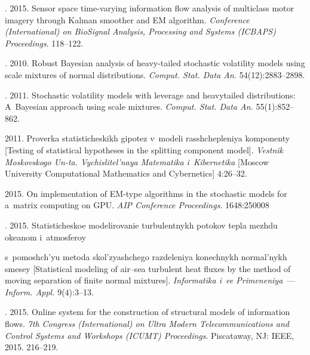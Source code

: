\begin{multicols}{2}
{{\begin{thebibliography}{99}
. 
2015. Sensor space time-varying information flow analysis of multiclass motor 
imagery through Kalman smoother and EM algorithm. \textit{Conference (International) on 
BioSignal Analysis, Processing and Systems (ICBAPS) Proceedings}. 118--122.

. 
2010. Robust Bayesian analysis of heavy-tailed stochastic volatility models using 
scale mixtures of normal distributions. 
\textit{Comput. Stat. Data An.} 54(12):2883--2898.

. 2011. 
Stochastic volatility models with leverage and heavytailed distributions: 
A~Bayesian approach using scale mixtures.
\textit{Comput. Stat.  Data An.} 55(1):852--862.

 2011. Proverka statisticheskikh gipotez 
v~modeli rasshchepleniya komponenty [Testing of statistical hypotheses in the 
splitting component model]. 
\textit{Vestnik Moskovskogo Un-ta. Vychislitel'naya Matematika i~Kibernetika}
[Moscow University Computational Mathematics and Cybernetics] 4:26--32.

 2015. 
On implementation of EM-type algorithms in the stochastic models for 
a~matrix computing on GPU. \textit{AIP Conference Proceedings}. 1648:250008


. 
2015. Statisticheskoe modelirovanie turbulentnykh potokov tepla mezhdu okeanom 
i~at\-mo\-sfe\-roy\linebreak\vspace*{-12pt}

\pagebreak

\noindent
 s~pomoshch'yu metoda skol'zyashchego razdeleniya konech\-nykh 
normal'nykh smesey [Statistical modeling of air--sea turbulent heat fluxes by 
the method of moving separation of finite normal mixtures]. \textit{Informatika 
i~ee Primeneniya}~--- \textit{Inform. Appl.} 9(4):3--13.

. 
2015. Online system for the construction of structural models of information flows. 
\textit{7th  Congress (International) on Ultra Modern Telecommunications and 
Control Systems and Workshops (ICUMT) Proceedings}. Piscataway, NJ: IEEE, 2015. 
216--219.
\end{thebibliography}

 }
 }

\end{multicols}

